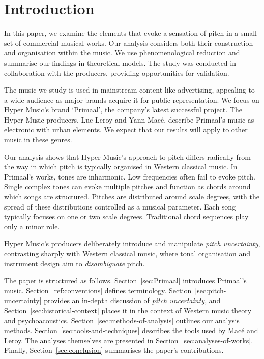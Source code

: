 \documentclass{article}
\begin{document}
\newpage
\section{Introduction}

In this paper, we examine the elements that evoke a sensation of pitch in a small set of commercial musical works. Our analysis considers both their construction and organisation within the music. We use phenomenological reduction and summarise our findings in theoretical models. The study was conducted in collaboration with the producers, providing opportunities for validation.

The music we study is used in mainstream content like advertising, appealing to a wide audience as major brands acquire it for public representation. We focus on Hyper Music's brand `Primaal', the company's latest successful project. The Hyper Music producers, Luc Leroy and Yann Mac\'e, describe Primaal's music as electronic with urban elements. We expect that our results will apply to other music in these genres.

Our analysis shows that Hyper Music's approach to pitch differs radically from the way in which pitch is typically organised in Western classical music. In Primaal's works, tones are inharmonic. Low frequencies often fail to evoke pitch. Single complex tones can evoke multiple pitches and function as chords around which songs are structured. Pitches are distributed around scale degrees, with the spread of these distributions controlled as a musical parameter. Each song typically focuses on one or two scale degrees. Traditional chord sequences play only a minor role.

Hyper Music's producers deliberately introduce and manipulate {\em pitch uncertainty}, contrasting sharply with Western classical music, where tonal organisation and instrument design aim to {\em disambiguate\/} pitch.

The paper is structured as follows. Section~\ref{sec:Primaal} introduces Primaal's music.
Section~\ref{ref:conventions} defines terminology. Section~\ref{sec:pitch-uncertainty} provides an in-depth discussion of {\em pitch uncertainty}, and Section~\ref{sec:historical-context} places it in the context of Western music theory and psychoacoustics. Section~\ref{sec:methods-of-analysis} outlines our analysis methods. Section~\ref{sec:tools-and-techniques} describes the tools used by Mac\'e and Leroy. The analyses themselves are presented in Section~\ref{sec:analyses-of-works}. Finally, Section~\ref{sec:conclusion} summarises the paper's contributions.
\end{document}
